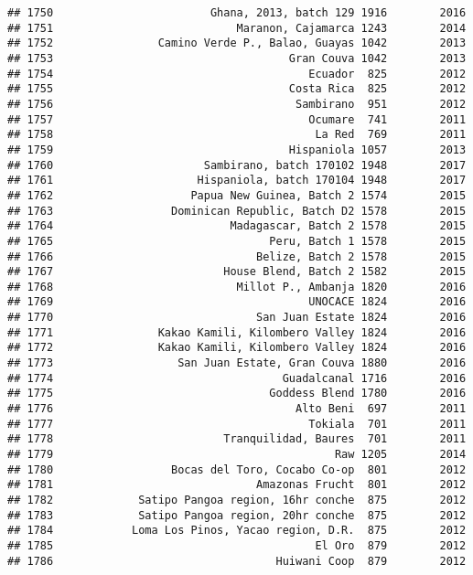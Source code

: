 \documentclass[
]{article}
\begin{document}
\begin{verbatim}
## 1750                        Ghana, 2013, batch 129 1916        2016
## 1751                            Maranon, Cajamarca 1243        2014
## 1752                Camino Verde P., Balao, Guayas 1042        2013
## 1753                                    Gran Couva 1042        2013
## 1754                                       Ecuador  825        2012
## 1755                                    Costa Rica  825        2012
## 1756                                     Sambirano  951        2012
## 1757                                       Ocumare  741        2011
## 1758                                        La Red  769        2011
## 1759                                    Hispaniola 1057        2013
## 1760                       Sambirano, batch 170102 1948        2017
## 1761                      Hispaniola, batch 170104 1948        2017
## 1762                     Papua New Guinea, Batch 2 1574        2015
## 1763                  Dominican Republic, Batch D2 1578        2015
## 1764                           Madagascar, Batch 2 1578        2015
## 1765                                 Peru, Batch 1 1578        2015
## 1766                               Belize, Batch 2 1578        2015
## 1767                          House Blend, Batch 2 1582        2015
## 1768                            Millot P., Ambanja 1820        2016
## 1769                                       UNOCACE 1824        2016
## 1770                               San Juan Estate 1824        2016
## 1771                Kakao Kamili, Kilombero Valley 1824        2016
## 1772                Kakao Kamili, Kilombero Valley 1824        2016
## 1773                   San Juan Estate, Gran Couva 1880        2016
## 1774                                   Guadalcanal 1716        2016
## 1775                                 Goddess Blend 1780        2016
## 1776                                     Alto Beni  697        2011
## 1777                                       Tokiala  701        2011
## 1778                          Tranquilidad, Baures  701        2011
## 1779                                           Raw 1205        2014
## 1780                  Bocas del Toro, Cocabo Co-op  801        2012
## 1781                               Amazonas Frucht  801        2012
## 1782             Satipo Pangoa region, 16hr conche  875        2012
## 1783             Satipo Pangoa region, 20hr conche  875        2012
## 1784            Loma Los Pinos, Yacao region, D.R.  875        2012
## 1785                                        El Oro  879        2012
## 1786                                  Huiwani Coop  879        2012

\end{verbatim}
\end{document}
